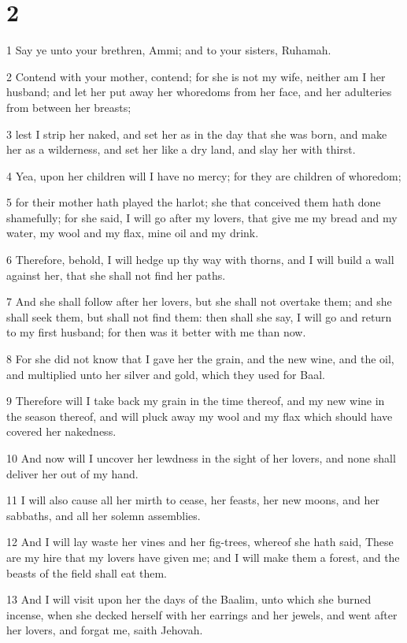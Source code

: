 \chapter{2}

\par 1 Say ye unto your brethren, Ammi; and to your sisters, Ruhamah.
\par 2 Contend with your mother, contend; for she is not my wife, neither am I her husband; and let her put away her whoredoms from her face, and her adulteries from between her breasts;
\par 3 lest I strip her naked, and set her as in the day that she was born, and make her as a wilderness, and set her like a dry land, and slay her with thirst.
\par 4 Yea, upon her children will I have no mercy; for they are children of whoredom;
\par 5 for their mother hath played the harlot; she that conceived them hath done shamefully; for she said, I will go after my lovers, that give me my bread and my water, my wool and my flax, mine oil and my drink.
\par 6 Therefore, behold, I will hedge up thy way with thorns, and I will build a wall against her, that she shall not find her paths.
\par 7 And she shall follow after her lovers, but she shall not overtake them; and she shall seek them, but shall not find them: then shall she say, I will go and return to my first husband; for then was it better with me than now.
\par 8 For she did not know that I gave her the grain, and the new wine, and the oil, and multiplied unto her silver and gold, which they used for Baal.
\par 9 Therefore will I take back my grain in the time thereof, and my new wine in the season thereof, and will pluck away my wool and my flax which should have covered her nakedness.
\par 10 And now will I uncover her lewdness in the sight of her lovers, and none shall deliver her out of my hand.
\par 11 I will also cause all her mirth to cease, her feasts, her new moons, and her sabbaths, and all her solemn assemblies.
\par 12 And I will lay waste her vines and her fig-trees, whereof she hath said, These are my hire that my lovers have given me; and I will make them a forest, and the beasts of the field shall eat them.
\par 13 And I will visit upon her the days of the Baalim, unto which she burned incense, when she decked herself with her earrings and her jewels, and went after her lovers, and forgat me, saith Jehovah.
